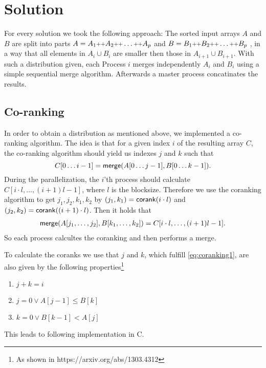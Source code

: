 \section{Solution}
For every solution we took the following approach:
The sorted input arrays $A$ and $B$ are split into parts
$A = A_1 \concat A_2 \concat \ldots \concat A_p$  and
$B = B_1 \concat B_2 \concat \ldots \concat B_p$
, in a way that all elements in $A_i \cup B_i$ are smaller then those in $A_{i+1} \cup B_{i+1}$. 
With such a distribution given, each Process $i$ merges independently $A_i$ and $B_i$ using a simple sequential merge algorithm.
Afterwards a master process concatinates the results.

\subsection{Co-ranking}
In order to obtain a distribution as mentioned above, we implemented a co-ranking algorithm.
The idea is that for a given index $i$ of the resulting array $C$, 
the co-ranking algorithm should yield us indexes $j$ and $k$
such that
\begin{equation}\label{eq:coranking1}
  C[0\ldots i-1] = \merge(A[0\ldots j-1],B[0\ldots k-1]).
\end{equation}
During the parallelization, the $i$'th process should calculate $C[i \cdot l, \ldots, (i+1) l - 1]$,
where $l$ is the blocksize.
Therefore we use the coranking algorithm to get $j_1, j_2, k_1, k_2$ by
$(j_1,k_1) = \corank(i\cdot l)$ and $(j_2,k_2) = \corank((i+1)\cdot l)$.
Then it holds that
\begin{align*}
  \merge(A[j_1,\ldots,j_2],B[k_1,\ldots,k_2]) = C[i \cdot l,\ldots, (i+1)l - 1].
\end{align*}
So each process calcultes the coranking and then performs a merge.

To calculate the coranks we use that
$j$ and $k$, which fulfill \eqref{eq:coranking1}, are also given by the following
properties\footnote{As shown in https://arxiv.org/abs/1303.4312}
\begin{enumerate}
  \item $j + k = i$
  \item $j = 0 \vee A[j-1] \leq B[k]$
  \item $k = 0 \vee B[k-1] < A[j]$
\end{enumerate}
This leads to following implementation in C.



